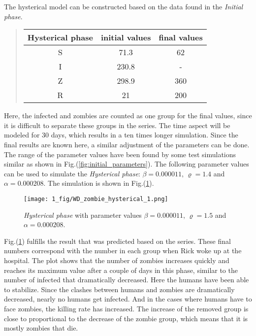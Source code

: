 \documentclass[%
twoside,                 %
final,                   %
chapterprefix=true,      %
open=right               %
10pt]{book}
\begin{document}
\vspace{3mm}




\vspace{3mm}


The hysterical model can be constructed based on the data found in the \emph{Initial phase}. 


\begin{quote}
\begin{tabular}{ccc}
\hline
\multicolumn{1}{c}{ Hysterical phase } & \multicolumn{1}{c}{ initial values } & \multicolumn{1}{c}{ final values } \\
\hline
S                & 71.3           & 62           \\
I                & 230.8          & -            \\
Z                & 298.9          & 360          \\
R                & 21             & 200          \\
\hline
\end{tabular}
\end{quote}

\noindent
Here, the infected and zombies are counted as one group for the final values, since it is difficult to separate these groups in the series. The time aspect will be modeled for 30 days, which results in a ten times longer simulation. Since the final results are known here, a similar adjustment of the parameters can be done. The range of the parameter values have been found by some test simulations similar as shown in Fig.(\ref{fig:initial_parameters}). The following parameter values can be used to simulate the \emph{Hysterical phase}: $\beta=0.000011$, $\varrho=1.4$ and $\alpha = 0.000208$. The simulation is shown in Fig.(\ref{fig:hysterical_1}).


\vspace{3mm}




\vspace{3mm}




\begin{figure}[ht]
  \centerline{\texttt{[image: 1\_fig/WD\_zombie\_hysterical\_1.png]}}
  \caption{
  \label{fig:hysterical_1} \emph{Hysterical phase} with parameter values $\beta = 0.000011$, $\varrho = 1.5$ and $\alpha = 0.000208$.
  }
\end{figure}


Fig.(\ref{fig:hysterical_1}) fulfills the result that was predicted based on the series. These final numbers correspond with the number in each group when Rick woke up at the hospital. The plot shows that the number of zombies increases quickly and reaches its maximum value after a couple of days in this phase, similar to the number of infected that dramatically decreased. Here the humans have been able to stabilize. Since the clashes between humans and zombies are dramatically decreased, nearly no humans get infected. And in the cases where humans have to face zombies, the killing rate has increased. The increase of the removed group is close to proportional to the decrease of the zombie group, which means that it is mostly zombies that die.
\end{document}
